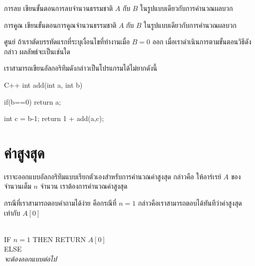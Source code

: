 \begin{quiz}{การ{\wbr}ลบ}
เขียน{\wbr}ขั้นตอน{\wbr}การ{\wbr}ลบ{\wbr}จำนวน{\wbr}ธรรมชาติ $A$ กับ $B$ ใน{\wbr}รูปแบบ{\wbr}เดียวกับ{\wbr}การ{\wbr}คำนวณ{\wbr}ผลบวก{\wbr}
\end{quiz}

\begin{quiz}{การ{\wbr}คูณ}
เขียน{\wbr}ขั้นตอน{\wbr}การ{\wbr}คูณ{\wbr}จำนวน{\wbr}ธรรมชาติ $A$ กับ $B$ ใน{\wbr}รูปแบบ{\wbr}เดียวกับ{\wbr}การ{\wbr}คำนวณ{\wbr}ผลบวก{\wbr}
\end{quiz}

\begin{quiz}{ศูนย์}
ถ้า{\wbr}เรา{\wbr}ตัด{\wbr}บรรทัด{\wbr}แรก{\wbr}ที่{\wbr}ระบุ{\wbr}เงื่อนไข{\wbr}ที่ทำงาน{\wbr}เมื่อ $B=0$ ออก  เมื่อ{\wbr}เรา{\wbr}ดำเนินการ{\wbr}ตาม{\wbr}ขั้นตอนวิธี{\wbr}ดังกล่าว ผลลัพธ์{\wbr}จะ{\wbr}เป็น{\wbr}เช่น{\wbr}ใด{\wbr}
\end{quiz}

เรา{\wbr}สามารถ{\wbr}เขียน{\wbr}อัล{\wbr}กอ{\wbr}ริ{\wbr}ทึม{\wbr}ดังกล่าว{\wbr}เป็น{\wbr}โปรแกรม{\wbr}ได้{\wbr}ไม่{\wbr}ยาก{\wbr}ดังนี้{\wbr}

\latintext
\begin{codelist}{C++}{}
int add(int a, int b)
{
  if(b==0)
    return a;

  int c = b-1;
  return 1 + add(a,c);
}
\end{codelist}
\thaitext

\section{ค่าสูงสุด}

เรา{\wbr}จะ{\wbr}ออกแบบ{\wbr}อัล{\wbr}กอ{\wbr}ริ{\wbr}ทึม{\wbr}แบบ{\wbr}เรียก{\wbr}ตัวเอง{\wbr}สำหรับ{\wbr}การ{\wbr}คำนวณ{\wbr}ค่าสูงสุด กล่าวคือ{\wbr}
ให้{\wbr}อาร์เรย์ $A$ ของ{\wbr}จำนวนเต็ม $n$ จำนวน เรา{\wbr}ต้องการ{\wbr}คำนวณ{\wbr}ค่าสูงสุด{\wbr}

กรณี{\wbr}ที่{\wbr}เรา{\wbr}สามารถ{\wbr}ตอบ{\wbr}คำถาม{\wbr}ได้{\wbr}ง่าย คือ{\wbr}กรณี{\wbr}ที่ $n=1$
กล่าวคือ{\wbr}เรา{\wbr}สามารถ{\wbr}ตอบ{\wbr}ได้{\wbr}ทันที{\wbr}ว่า{\wbr}ค่าสูงสุด{\wbr}เท่า{\wbr}กับ $A[0]$

\begin{algt}
\\
\hspace*{0.2in} IF $n=1$ THEN RETURN $A[0]$\\
\hspace*{0.2in} ELSE\\
\hspace*{0.2in}\hspace*{0.2in} {\em จะ{\wbr}ต้อง{\wbr}ออกแบบ{\wbr}ต่อไป}
\end{algt}

